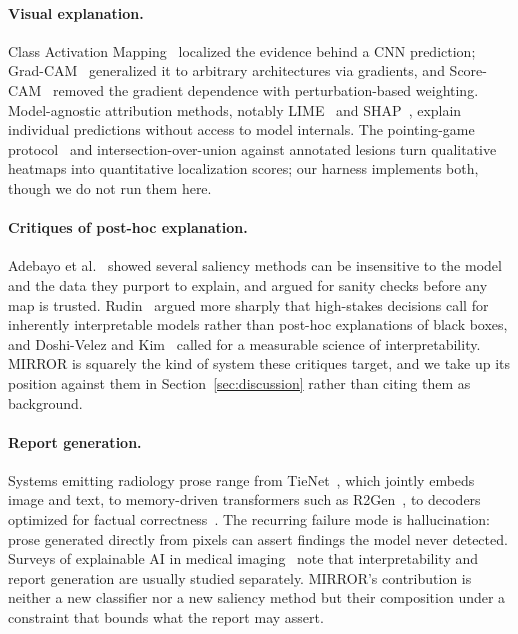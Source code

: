 \documentclass[10pt,twocolumn]{article}
\begin{document}
\paragraph{Visual explanation.} Class Activation
Mapping~\cite{zhou2016cam} localized the evidence behind a CNN prediction;
Grad-CAM~\cite{selvaraju2017gradcam} generalized it to arbitrary architectures via
gradients, and Score-CAM~\cite{wang2020scorecam} removed the gradient dependence
with perturbation-based weighting. Model-agnostic attribution methods, notably
LIME~\cite{ribeiro2016lime} and SHAP~\cite{lundberg2017shap}, explain individual
predictions without access to model internals. The pointing-game
protocol~\cite{zhang2016pointing} and intersection-over-union against annotated
lesions turn qualitative heatmaps into quantitative localization scores; our
harness implements both, though we do not run them here.

\paragraph{Critiques of post-hoc explanation.} Adebayo et
al.~\cite{adebayo2018sanity} showed several saliency methods can be insensitive to
the model and the data they purport to explain, and argued for sanity checks
before any map is trusted. Rudin~\cite{rudin2019stop} argued more sharply that
high-stakes decisions call for inherently interpretable models rather than
post-hoc explanations of black boxes, and Doshi-Velez and
Kim~\cite{doshivelez2017rigorous} called for a measurable science of
interpretability. MIRROR is squarely the kind of system these critiques target,
and we take up its position against them in Section~\ref{sec:discussion} rather
than citing them as background.

\paragraph{Report generation.} Systems emitting radiology prose range from
TieNet~\cite{wang2018tienet}, which jointly embeds image and text, to
memory-driven transformers such as R2Gen~\cite{chen2020r2gen}, to decoders
optimized for factual correctness~\cite{liu2019clinically}. The recurring failure
mode is hallucination: prose generated directly from pixels can assert findings
the model never detected. Surveys of explainable AI in medical
imaging~\cite{tjoa2021survey} note that interpretability and report generation are
usually studied separately. MIRROR's contribution is neither a new classifier nor
a new saliency method but their composition under a constraint that bounds what
the report may assert.
\end{document}
